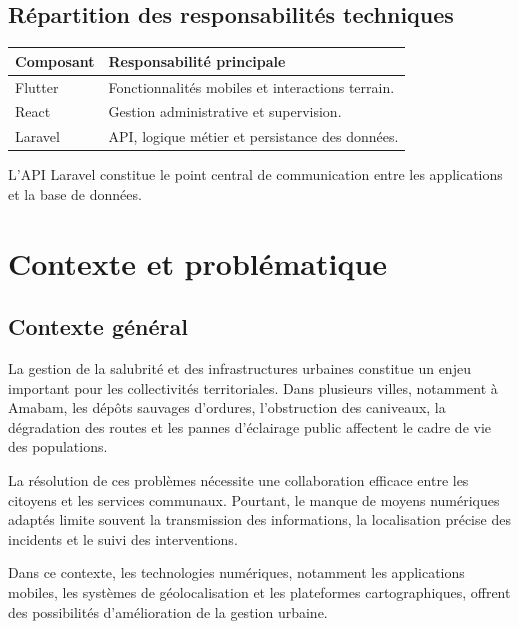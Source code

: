 \documentclass[11pt,a4paper,oneside]{report}
\begin{document}
	\subsection{Répartition des responsabilités techniques}
	\begin{table}[h!]
		\centering
		\small
		\renewcommand{\arraystretch}{1.15}
		\begin{tabular}{|p{3.5cm}|p{10.5cm}|}
			\hline
			\textbf{Composant} & \textbf{Responsabilité principale} \\ \hline
			Flutter & Fonctionnalités mobiles et interactions terrain. \\ \hline
			React & Gestion administrative et supervision. \\ \hline
			Laravel & API, logique métier et persistance des données. \\ \hline
		\end{tabular}
	\end{table}
	L'API Laravel constitue le point central de communication
	entre les applications et la base de données.
	
	
	
	\section{Contexte et problématique}
	
	\subsection{Contexte général}
	
	La gestion de la salubrité et des infrastructures
	urbaines constitue un enjeu important pour les
	collectivités territoriales. Dans plusieurs villes,
	notamment à Amabam, les dépôts sauvages d'ordures,
	l'obstruction des caniveaux, la dégradation des routes
	et les pannes d'éclairage public affectent le cadre de
	vie des populations.
	
	La résolution de ces problèmes nécessite une
	collaboration efficace entre les citoyens et les
	services communaux. Pourtant, le manque de moyens
	numériques adaptés limite souvent la transmission
	des informations, la localisation précise des incidents
	et le suivi des interventions.
	
	Dans ce contexte, les technologies numériques,
	notamment les applications mobiles, les systèmes de
	géolocalisation et les plateformes cartographiques,
	offrent des possibilités d'amélioration de la gestion
	urbaine.
	
\end{document}

